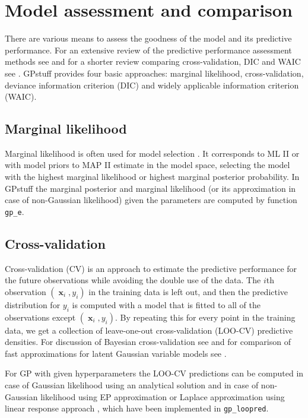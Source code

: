 \documentclass[twoside,11pt]{article}
\DeclareMathOperator{\x}{\mathbf{x}}
\newcommand{\pkg}[1]{{\fontseries{b}\selectfont #1}}
\newcommand{\code}[1]{{\normalfont\texttt{#1}}}
\begin{document}
\section{Model assessment and comparison}\label{sec:model_assessment}

There are various means to assess the goodness of the model and its
predictive performance. For an extensive review of the predictive
performance assessment methods see \citet{Vehtari+Ojanen:2012} and for
a shorter review comparing cross-validation, DIC and WAIC see
\citet{Gelman+Hwang+Vehtari:2014}. \pkg{GPstuff} provides four basic
approaches: marginal likelihood, cross-validation, deviance
information criterion (DIC) and widely applicable information
criterion (WAIC).

\subsection{Marginal likelihood}

Marginal likelihood is often used for model selection \citep[see,
e.g.][]{Kass+Raftery:1995}. It corresponds to ML II or with model
priors to MAP II estimate in the model space, selecting the model with
the highest marginal likelihood or highest marginal posterior
probability. 
%
In \pkg{GPstuff} the marginal posterior and marginal likelihood (or
its approximation in case of non-Gaussian likelihood) given the
parameters are computed by function \code{gp\_e}.

\subsection{Cross-validation}
\label{sec:cross-validation}

Cross-validation (CV) is an approach to estimate the predictive
performance for the future observations while avoiding the double use
of the data. The $i$th observation $(\x_{i},y_{i})$ in the training
data is left out, and then the predictive distribution for $y_i$ is
computed with a model that is fitted to all of the observations except
$(\x_i,y_i)$.
%
By repeating this for every point in the training data, we get a
collection of leave-one-out cross-validation (LOO-CV) predictive
densities.
%
For discussion of Bayesian cross-validation see \citet{Vehtari+Lampinen:2002,Vehtari+Ojanen:2012,Gelman+Hwang+Vehtari:2014} and for comparison of fast approximations for latent Gaussian variable models see \citet{Vehtari+etal:2014}.

For GP with given hyperparameters the LOO-CV predictions can be
computed in case of Gaussian likelihood using an analytical
solution \citep{Sundararajan+Keerthi:2001a} and in case of
non-Gaussian likelihood using EP approximation
\citep{Opper+Winther:2000,Rasmussen+Williams:2006} or Laplace
approximation using linear response approach \citep{Vehtari+etal:2014},
which have been implemented in \code{gp\_loopred}.
%
\end{document}
